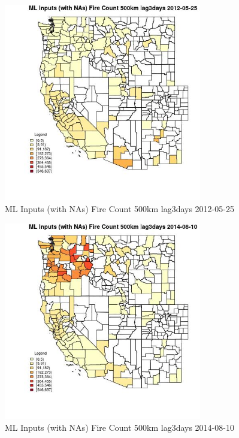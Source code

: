 \clearpage 

\begin{figure} 
\centering  
\includegraphics[width=0.77\textwidth]{Code_Outputs/Report_ML_input_PM25_Step4_part_e_de_duplicated_aves_compiled_2019-05-18wNAs_CountyFire_Count_500km_lag3daysMean2012-05-25.jpg} 
\caption{\label{fig:Report_ML_input_PM25_Step4_part_e_de_duplicated_aves_compiled_2019-05-18wNAsCountyFire_Count_500km_lag3daysMean2012-05-25}ML Inputs (with NAs) Fire Count 500km lag3days 2012-05-25} 
\end{figure} 
 

\begin{figure} 
\centering  
\includegraphics[width=0.77\textwidth]{Code_Outputs/Report_ML_input_PM25_Step4_part_e_de_duplicated_aves_compiled_2019-05-18wNAs_CountyFire_Count_500km_lag3daysMean2014-08-10.jpg} 
\caption{\label{fig:Report_ML_input_PM25_Step4_part_e_de_duplicated_aves_compiled_2019-05-18wNAsCountyFire_Count_500km_lag3daysMean2014-08-10}ML Inputs (with NAs) Fire Count 500km lag3days 2014-08-10} 
\end{figure} 
 

